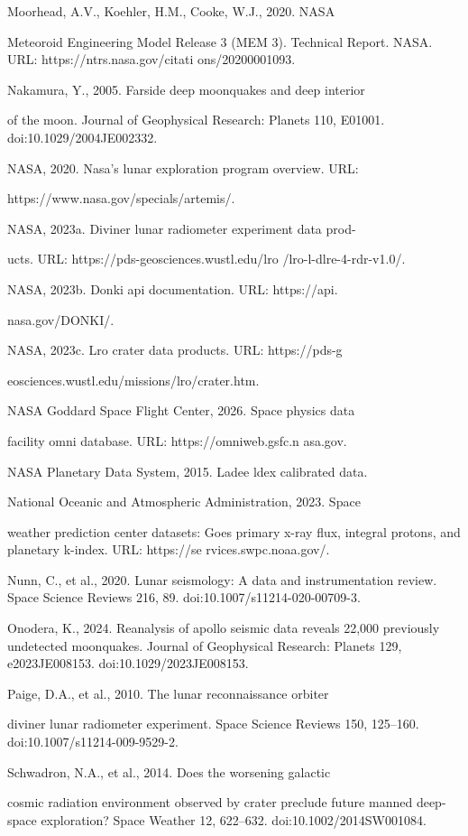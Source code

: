 Moorhead, A.V., Koehler, H.M., Cooke, W.J., 2020. NASA

Meteoroid Engineering Model Release 3 (MEM 3). Technical Report. NASA. URL: https://ntrs.nasa.gov/citati ons/20200001093.

Nakamura, Y., 2005. Farside deep moonquakes and deep interior

of the moon. Journal of Geophysical Research: Planets 110, E01001. doi:10.1029/2004JE002332.

NASA, 2020. Nasa's lunar exploration program overview. URL:

https://www.nasa.gov/specials/artemis/.

NASA, 2023a. Diviner lunar radiometer experiment data prod-

ucts. URL: https://pds-geosciences.wustl.edu/lro /lro-l-dlre-4-rdr-v1.0/.

NASA, 2023b. Donki api documentation. URL: https://api.

nasa.gov/DONKI/.

NASA, 2023c. Lro crater data products. URL: https://pds-g

eosciences.wustl.edu/missions/lro/crater.htm.

NASA Goddard Space Flight Center, 2026. Space physics data

facility omni database. URL: https://omniweb.gsfc.n asa.gov.

NASA Planetary Data System, 2015. Ladee ldex calibrated data.

National Oceanic and Atmospheric Administration, 2023. Space

weather prediction center datasets: Goes primary x-ray flux, integral protons, and planetary k-index. URL: https://se rvices.swpc.noaa.gov/.

Nunn, C., et al., 2020. Lunar seismology: A data and instrumentation review. Space Science Reviews 216, 89. doi:10.1007/s11214-020-00709-3.

Onodera, K., 2024. Reanalysis of apollo seismic data reveals 22,000 previously undetected moonquakes. Journal of Geophysical Research: Planets 129, e2023JE008153. doi:10.1029/2023JE008153.

Paige, D.A., et al., 2010. The lunar reconnaissance orbiter

diviner lunar radiometer experiment. Space Science Reviews 150, 125--160. doi:10.1007/s11214-009-9529-2.

Schwadron, N.A., et al., 2014. Does the worsening galactic

cosmic radiation environment observed by crater preclude future manned deep-space exploration? Space Weather 12, 622--632. doi:10.1002/2014SW001084.

